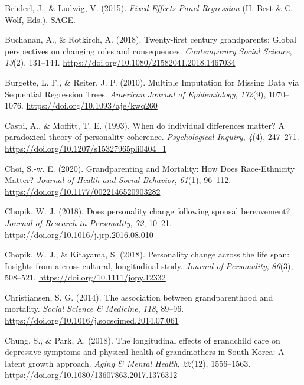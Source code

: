 \documentclass[
  english,
  man, noextraspace]{apa7}
\begin{document}
\leavevmode\hypertarget{ref-bruderlFixedEffectsPanelRegression2015}{}%
Brüderl, J., \& Ludwig, V. (2015). \emph{Fixed-Effects Panel Regression} (H. Best \& C. Wolf, Eds.). SAGE.

\leavevmode\hypertarget{ref-buchananTwentyfirstCenturyGrandparents2018}{}%
Buchanan, A., \& Rotkirch, A. (2018). Twenty-first century grandparents: Global perspectives on changing roles and consequences. \emph{Contemporary Social Science}, \emph{13}(2), 131--144. \url{https://doi.org/10.1080/21582041.2018.1467034}

\leavevmode\hypertarget{ref-burgetteMultipleImputationMissing2010}{}%
Burgette, L. F., \& Reiter, J. P. (2010). Multiple Imputation for Missing Data via Sequential Regression Trees. \emph{American Journal of Epidemiology}, \emph{172}(9), 1070--1076. \url{https://doi.org/10.1093/aje/kwq260}

\leavevmode\hypertarget{ref-caspiWhenIndividualDifferences1993}{}%
Caspi, A., \& Moffitt, T. E. (1993). When do individual differences matter? A paradoxical theory of personality coherence. \emph{Psychological Inquiry}, \emph{4}(4), 247--271. \url{https://doi.org/10.1207/s15327965pli0404_1}

\leavevmode\hypertarget{ref-choiGrandparentingMortalityHow2020}{}%
Choi, S.-w. E. (2020). Grandparenting and Mortality: How Does Race-Ethnicity Matter? \emph{Journal of Health and Social Behavior}, \emph{61}(1), 96--112. \url{https://doi.org/10.1177/0022146520903282}

\leavevmode\hypertarget{ref-chopikDoesPersonalityChange2018}{}%
Chopik, W. J. (2018). Does personality change following spousal bereavement? \emph{Journal of Research in Personality}, \emph{72}, 10--21. \url{https://doi.org/10.1016/j.jrp.2016.08.010}

\leavevmode\hypertarget{ref-chopikPersonalityChangeLife2018}{}%
Chopik, W. J., \& Kitayama, S. (2018). Personality change across the life span: Insights from a cross-cultural, longitudinal study. \emph{Journal of Personality}, \emph{86}(3), 508--521. \url{https://doi.org/10.1111/jopy.12332}

\leavevmode\hypertarget{ref-christiansenAssociationGrandparenthoodMortality2014}{}%
Christiansen, S. G. (2014). The association between grandparenthood and mortality. \emph{Social Science \& Medicine}, \emph{118}, 89--96. \url{https://doi.org/10.1016/j.socscimed.2014.07.061}

\leavevmode\hypertarget{ref-chungLongitudinalEffectsGrandchild2018}{}%
Chung, S., \& Park, A. (2018). The longitudinal effects of grandchild care on depressive symptoms and physical health of grandmothers in South Korea: A latent growth approach. \emph{Aging \& Mental Health}, \emph{22}(12), 1556--1563. \url{https://doi.org/10.1080/13607863.2017.1376312}
\end{document}
